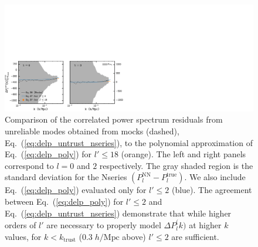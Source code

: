\begin{figure}
\begin{center}
\includegraphics[scale=0.5]{figs/fc/mock_catalog_tophatconv_delPlk_untrusted_18_rebin6x.pdf}
\caption{Comparison of the correlated power spectrum residuals from unreliable modes obtained from mocks (dashed), Eq.~(\ref{eq:delp_untrust_nseries}), 
to the polynomial approximation of  
Eq.~(\ref{eq:delp_poly}) for $l' \leq 18$ (orange). The left and right panels
correspond to $l = 0$ and $2$ respectively. The gray shaded region is the 
standard deviation for the Nseries $(P_l^\mathrm{NN} - P_l^\mathrm{true})$.  
We also include Eq.~(\ref{eq:delp_poly}) evaluated only for $l' \leq 2$ (blue). 
The agreement between Eq.~(\ref{eq:delp_poly}) for $l' \leq 2$ and Eq.~(\ref{eq:delp_untrust_nseries}) demonstrate that while higher orders of $l'$ are 
necessary to properly model $\Delta P_l^\mathrm(k)$ at higher $k$ values, 
for $k < k_\mathrm{trust}$ ($0.3\;h/\mathrm{Mpc}$ above) $l' \leq 2 $ are 
sufficient.}
\label{fig:delP_untrust}
\end{center}
\end{figure}


